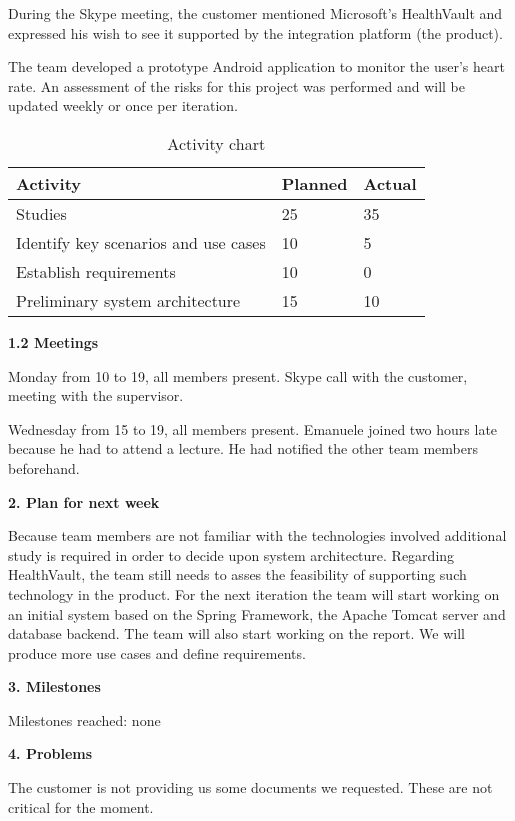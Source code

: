 During the Skype meeting, the customer mentioned Microsoft’s  HealthVault and expressed his wish to see it supported by the integration platform (the product).

The team developed a prototype Android application to monitor the user’s heart rate. An assessment of the risks for this project was performed and will be updated weekly or once per iteration.

\begin{table}[H]
\begin{center}
\begin{tabular}{ l | l | l }
  \hline
  Activity & Planned & Actual \\
  \hline\noalign{\smallskip}\noalign{\smallskip}\hline
  Studies & 25 & 35 \\
  Identify key scenarios and use cases & 10 & 5 \\
  Establish requirements & 10 & 0 \\
  Preliminary system architecture & 15 & 10 \\
  \hline
\end{tabular}
\end{center}
\caption{Activity chart}
\label{table:activityChartStatusReportWeek36}
\end{table}

\textbf{1.2 Meetings}

Monday
from 10 to 19, all members present.
Skype call with the customer, meeting with the supervisor.

Wednesday
from 15 to 19, all members present. Emanuele joined two hours late because he had to attend a lecture. 
He had notified the other team members beforehand.

\textbf{2. Plan for next week}

Because team members are not familiar with the technologies involved  additional study is required in order to decide upon system architecture.
Regarding HealthVault, the team still needs to asses the feasibility of supporting such technology in the product. 
For the next iteration the team will start working on an initial system based on the Spring Framework, the Apache Tomcat server and database backend. 
The team will also start working on the report. 
We will produce more use cases and define requirements.

\textbf{3. Milestones}

Milestones reached: none

\textbf{4. Problems}

The customer is not providing us some documents we requested.
These are not critical for the moment.

